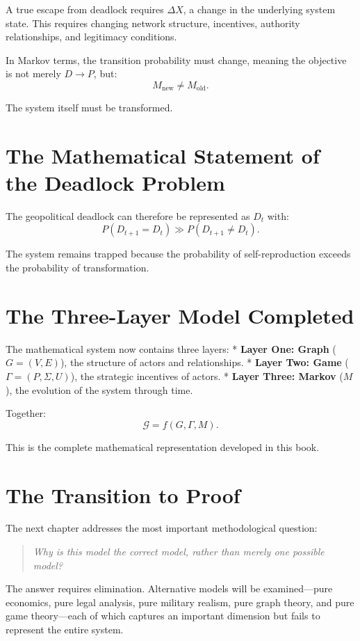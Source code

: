 \documentclass[11pt,openany]{book}
\theoremstyle{plain}
\theoremstyle{definition}
\begin{document}
A true escape from deadlock requires \(\Delta X\), a change in the underlying system state. This requires changing network structure, incentives, authority relationships, and legitimacy conditions. 

In Markov terms, the transition probability must change, meaning the objective is not merely \(D \to P\), but:
\[
M_{\text{new}} \neq M_{\text{old}}.
\]

The system itself must be transformed.

\section*{The Mathematical Statement of the Deadlock Problem}

The geopolitical deadlock can therefore be represented as \(D_t\) with:
\[
P(D_{t+1} = D_t) \gg P(D_{t+1} \neq D_t).
\]

The system remains trapped because the probability of self-reproduction exceeds the probability of transformation.

\section*{The Three-Layer Model Completed}

The mathematical system now contains three layers:
* \textbf{Layer One: Graph} ($G = (V, E)$), the structure of actors and relationships.
* \textbf{Layer Two: Game} ($\Gamma=(P,\Sigma,U)$), the strategic incentives of actors.
* \textbf{Layer Three: Markov} ($M$), the evolution of the system through time.

Together:
\[
\boxed{
\mathcal{G} = f(G, \Gamma, M).
}
\]

This is the complete mathematical representation developed in this book.

\section*{The Transition to Proof}

The next chapter addresses the most important methodological question:
\begin{quote}
\textit{Why is this model the correct model, rather than merely one possible model?}
\end{quote}

The answer requires elimination. Alternative models will be examined—pure economics, pure legal analysis, pure military realism, pure graph theory, and pure game theory—each of which captures an important dimension but fails to represent the entire system.
\end{document}
